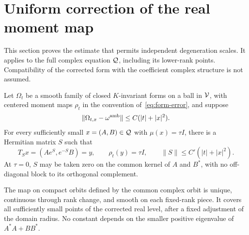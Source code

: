\section{Uniform correction of the real moment map}\label{sec:balancing}

This section proves the estimate that permits independent degeneration
scales. It applies to the full complex equation $\mathcal Q$, including its
lower-rank points. Compatibility of the corrected form with the
coefficient complex structure is not assumed.

\begin{theorem}\label{thm:balancing}
Let $\Omega_t$ be a smooth family of closed $K$-invariant forms on
a ball in $\mathcal V$, with centered moment maps $\rho_t$ in the convention
of~\eqref{eq:form-error}, and suppose
\begin{equation}\label{eq:abstract-form-bound}
\|\Omega_{t,x}-\omega^{\rm amb}\|\le C(|t|+|x|^2).
\end{equation}
For every sufficiently small $x=(A,B)\in\mathcal Q$ with $\mu(x)=\tau I$,
there is a Hermitian matrix $S$ such that
\begin{equation}\label{eq:balanced-correction}
T_Sx=(Ae^S,e^{-S}B)=y,\qquad
\rho_t(y)=\tau I,\qquad
\|S\|\le C'(|t|+|x|^2).
\end{equation}
At $\tau=0$, $S$ may be taken zero on the common kernel of $A$ and
$B^*$, with no off-diagonal block to its orthogonal complement.

The map on compact orbits defined by the common complex orbit is unique,
continuous through rank change, and smooth on each fixed-rank piece.
It covers all sufficiently small points of the corrected real level,
after a fixed adjustment of the domain radius. No constant depends on
the smaller positive eigenvalue of $A^*A+BB^*$.
\end{theorem}

